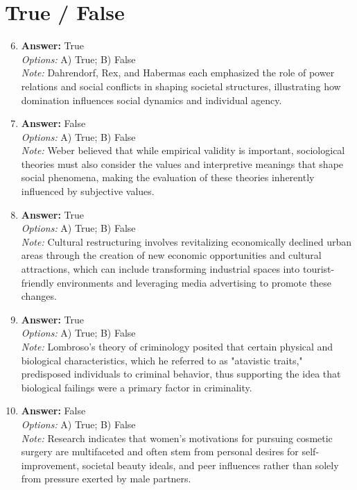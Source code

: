 \documentclass[12pt]{article}
\begin{document}
\section*{True / False}
\begin{enumerate}[label=\arabic*.]
\setcounter{enumi}{5}
\item \textbf{Answer:} True
\\ \textit{Options:} A) True; B) False
\\ \textit{Note:} Dahrendorf, Rex, and Habermas each emphasized the role of power relations and social conflicts in shaping societal structures, illustrating how domination influences social dynamics and individual agency.
\item \textbf{Answer:} False
\\ \textit{Options:} A) True; B) False
\\ \textit{Note:} Weber believed that while empirical validity is important, sociological theories must also consider the values and interpretive meanings that shape social phenomena, making the evaluation of these theories inherently influenced by subjective values.
\item \textbf{Answer:} True
\\ \textit{Options:} A) True; B) False
\\ \textit{Note:} Cultural restructuring involves revitalizing economically declined urban areas through the creation of new economic opportunities and cultural attractions, which can include transforming industrial spaces into tourist-friendly environments and leveraging media advertising to promote these changes.
\item \textbf{Answer:} True
\\ \textit{Options:} A) True; B) False
\\ \textit{Note:} Lombroso's theory of criminology posited that certain physical and biological characteristics, which he referred to as "atavistic traits," predisposed individuals to criminal behavior, thus supporting the idea that biological failings were a primary factor in criminality.
\item \textbf{Answer:} False
\\ \textit{Options:} A) True; B) False
\\ \textit{Note:} Research indicates that women's motivations for pursuing cosmetic surgery are multifaceted and often stem from personal desires for self-improvement, societal beauty ideals, and peer influences rather than solely from pressure exerted by male partners.
\end{enumerate}
\end{document}
